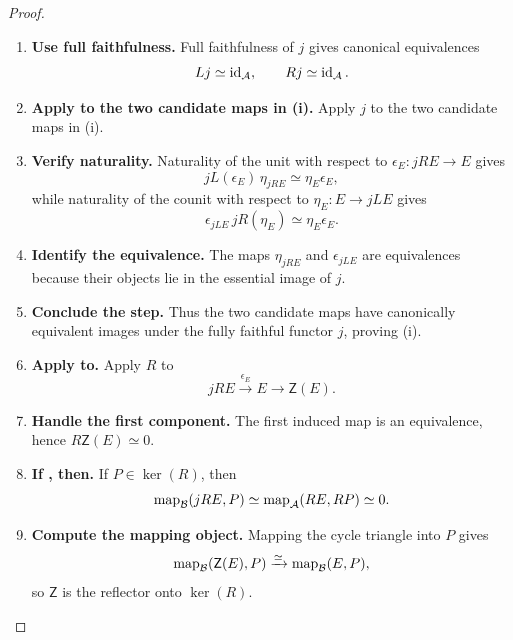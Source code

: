 \begin{proof}
\leavevmode
\begin{enumerate}[label=\textup{(\arabic*)}]
    \item \textbf{Use full faithfulness.}
    Full faithfulness of \(j\) gives canonical equivalences
    \[
            Lj\simeq\operatorname{id}_{\mathcal A},
            \qquad
            Rj\simeq\operatorname{id}_{\mathcal A}.
        \]

    \item \textbf{Apply to the two candidate maps in (i).}
    Apply \(j\) to the two candidate maps in \textup{(i)}.

    \item \textbf{Verify naturality.}
    Naturality of the unit with respect to \(\epsilon_E:jRE\to E\) gives
    \[
            jL(\epsilon_E)\,\eta_{jRE}
            \simeq
            \eta_E\epsilon_E,
        \]
    while naturality of the counit with respect to \(\eta_E:E\to jLE\) gives
    \[
            \epsilon_{jLE}\,jR(\eta_E)
            \simeq
            \eta_E\epsilon_E.
        \]

    \item \textbf{Identify the equivalence.}
    The maps \(\eta_{jRE}\) and \(\epsilon_{jLE}\) are equivalences because their objects lie in the
    essential image of \(j\).

    \item \textbf{Conclude the step.}
    Thus the two candidate maps have canonically equivalent images under the fully faithful
    functor \(j\), proving \textup{(i)}.

    \item \textbf{Apply to.}
    Apply \(R\) to
    \[
            jRE\xrightarrow{\epsilon_E}E\longrightarrow\mathsf Z(E).
        \]

    \item \textbf{Handle the first component.}
    The first induced map is an equivalence, hence \(R\mathsf Z(E)\simeq0\).

    \item \textbf{If , then.}
    If \(P\in\ker(R)\), then
    \[
            \operatorname{map}_{\mathcal B}(jRE,P)
            \simeq
            \operatorname{map}_{\mathcal A}(RE,RP)
            \simeq0.
        \]

    \item \textbf{Compute the mapping object.}
    Mapping the cycle triangle into \(P\) gives
    \[
            \operatorname{map}_{\mathcal B}(\mathsf Z(E),P)
            \xrightarrow{\simeq}
            \operatorname{map}_{\mathcal B}(E,P),
        \]
    so \(\mathsf Z\) is the reflector onto \(\ker(R)\).


\end{enumerate}
\end{proof}
